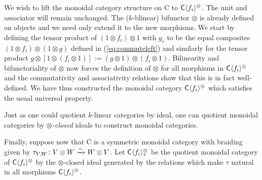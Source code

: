 \documentclass[12pt]{amsart}
\begin{document}
We wish to lift the monoidal category structure on {\sf C} to ${\sf C}\langle f_i \rangle^{\otimes}$. The unit and associator will remain unchanged. The ($k$-blinear) bifunctor $\otimes$ is already defined on objects and we need only extend it to the new morphisms. We start by defining the tensor product of $(1 \otimes f_i) \otimes 1$ with $g_r$ to be the equal composites $(1 \otimes f_i) \otimes (1 \otimes g)$ defined in (\ref{eq:commuteleft}) and similarly for the tensor product $g \otimes [1 \otimes (f_i \otimes 1)] := (g \otimes 1) \otimes (f_i \otimes 1)$. Bilinearity and bifunctoriality of $\otimes$ now forces the definition of $\otimes$ for all morphisms in  ${\sf C}\langle f_i\rangle^{\otimes}$ and the commutativity and associativity relations show that this is in fact well-defined. We have thus constructed the monoidal category ${\sf C}\langle f_i \rangle^{\otimes}$ which satisfies the usual universal property. 

Just as one could quotient $k$-linear categories by ideal, one can quotient monoidal categories by {\em $\otimes$-closed} ideals to construct monoidal categories. 

Finally, suppose now that {\sf C} is a symmetric monoidal category with braiding given by $\tau_{V,W} \colon V \otimes W \xrightarrow{\sim} W \otimes V$. Let ${\sf C} \langle f_i \rangle^{\otimes}_{\tau}$ be the quotient monoidal category of ${\sf C} \langle f_i \rangle^{\otimes}$ by the $\otimes$-closed ideal generated by the relations which make $\tau$ natural in all morphisms ${\sf C} \langle f_i \rangle^{\otimes}$. 




\end{document}
